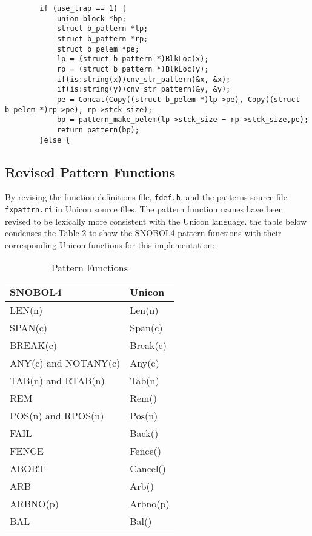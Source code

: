 \documentclass{article}
\begin{document}
\begin{verbatim}
		if (use_trap == 1) {	
			union block *bp;
			struct b_pattern *lp;
			struct b_pattern *rp;
			struct b_pelem *pe;
			lp = (struct b_pattern *)BlkLoc(x);
			rp = (struct b_pattern *)BlkLoc(y);
			if(is:string(x))cnv_str_pattern(&x, &x);
			if(is:string(y))cnv_str_pattern(&y, &y);
			pe = Concat(Copy((struct b_pelem *)lp->pe), Copy((struct b_pelem *)rp->pe), rp->stck_size);
			bp = pattern_make_pelem(lp->stck_size + rp->stck_size,pe);
			return pattern(bp);
		}else {
\end{verbatim}

\subsection{Revised Pattern Functions}
By revising the function definitions file, \texttt{fdef.h}, and the patterns source file \texttt{fxpattrn.ri} in Unicon source files.  The pattern function names have been revised to be lexically more consistent with the Unicon language.  the table below condenses the Table 2 to show the SNOBOL4 pattern functions with their corresponding Unicon functions for this implementation:  

\begin{table}[ht]
		\caption{Pattern Functions}
		\centering
		
		\begin{tabular}{|l|l|}
			\hline\hline
			SNOBOL4 & Unicon \\
			\hline
			LEN(n) & Len(n) \\
			SPAN(c) & Span(c)  \\
			BREAK(c) & Break(c) \\
			ANY(c) and NOTANY(c) & Any(c) \\
			TAB(n) and RTAB(n) & Tab(n) \\
			REM & Rem() \\
			POS(n) and RPOS(n) & Pos(n) \\
			FAIL & Back() \\
			FENCE & Fence() \\
			ABORT & Cancel() \\
			ARB & Arb() \\
			ARBNO(p) & Arbno(p) \\
			BAL & Bal() \\
			\hline
		\end{tabular}

\end{table}
\end{document}
